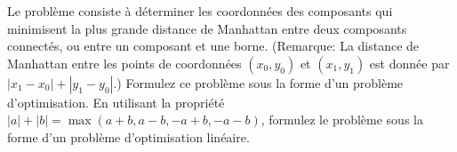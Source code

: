 \begin{enumerate}
    Le problème consiste à déterminer les coordonnées des composants qui minimisent
    la plus grande distance de Manhattan
    entre deux composants connectés, ou entre un composant et une borne. (Remarque: La distance de Manhattan entre les
    points de coordonnées
    $(x_0, y_0)$ et
    $(x_1, y_1)$ est donnée par
    $|x_1-x_0|+|y_1-y_0|$.) Formulez ce problème sous la forme d'un problème
    d'optimisation. En utilisant la propriété
    $|a|+|b|=\max(a+b, a-b, -a+b, -a-b)$, formulez le problème sous la
    forme d'un problème d'optimisation linéaire.

    \begin{solution}

    \end{solution}

\end{enumerate}
